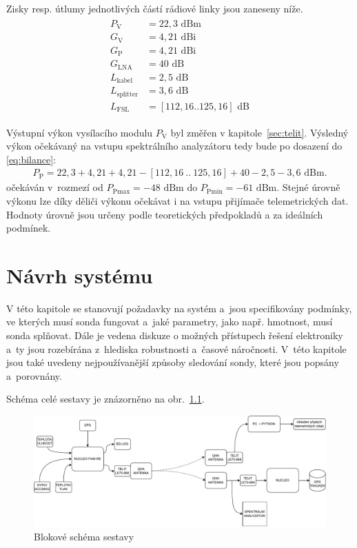 \documentclass[twoside]{ctuthesis}
\newcommand{\mt}[1]{\text{#1}}
\theoremstyle{plain}
\theoremstyle{definition}
\theoremstyle{note}
\begin{document}
		Zisky resp. útlumy jednotlivých částí rádiové linky jsou zaneseny níže.
		\begin{align*}
			\begin{split}
				P_\mt{V} &= 22{,}3\mt{ dBm}\\
				G_\mt{V} &= 4{,}21\mt{ dBi}\\
				G_\mt{P} &= 4{,}21\mt{ dBi}\\
				G_\mt{LNA} &= 40 \mt{ dB}\\
				L_\mt{kabel} &= 2{,}5\mt{ dB}\\
				L_\mt{splitter} &= 3{,}6\mt{ dB}\\
				L_\mt{FSL} &= [112{,}16 .. 125{,}16]\mt{ dB}
			\end{split}
		\end{align*}

		Výstupní výkon vysílacího modulu $P_\mt{V}$ byl změřen v kapitole~\ref{sec:telit}. Výsledný výkon očekávaný na vstupu spektrálního analyzátoru tedy bude po dosazení do \eqref{eq:bilance}:
		\begin{align}
			P_\mt{P} = 22{,}3 + 4{,}21 + 4{,}21 - [112{,}16~..~125{,}16] + 40 - 2{,}5 - 3{,}6\mt{ dBm}.
		\end{align}
		očekáván v~rozmezí od $P_\mt{Pmax} = -48\mt{ dBm}$ do $P_\mt{Pmin} = -61\mt{ dBm}$. Stejné úrovně výkonu lze díky děliči výkonu očekávat i na vstupu přijímače telemetrických dat. Hodnoty úrovně jsou určeny podle teoretických předpokladů a za ideálních podmínek. 















\chapter{Návrh systému}
V této kapitole se stanovují požadavky na systém a~jsou specifikovány podmínky, ve kterých musí sonda fungovat a~jaké parametry, jako např. hmotnost, musí sonda splňovat. Dále je vedena  diskuze o možných přístupech řešení elektroniky a~ty jsou rozebírána z~hlediska robustnosti a~časové náročnosti. V~této kapitole jsou také uvedeny nejpoužívanější způsoby sledování sondy, které jsou popsány a~porovnány.

Schéma celé sestavy je znázorněno na obr.~\ref{fig:sestava:blokac}.
\begin{figure}
	\centering
	\includegraphics[width=\textwidth]{Figures/sonda_blokac.drawio.pdf}
	\caption{Blokové schéma sestavy}
	\label{fig:sestava:blokac}
\end{figure}
\end{document}
